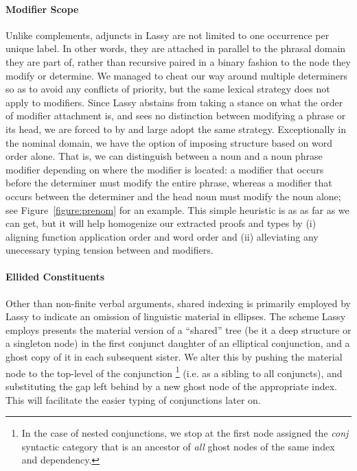 \paragraph{Modifier Scope}
Unlike complements, adjuncts in Lassy are not limited to one occurrence per unique label.
In other words, they are attached in parallel to the phrasal domain they are part of, rather than recursive paired in a binary fashion to the node they modify or determine.
We managed to cheat our way around multiple determiners so as to avoid any conflicts of priority, but the same lexical strategy does not apply to modifiers.
Since Lassy abstains from taking a stance on what the order of modifier attachment is, and sees no distinction between modifying a phrase or its head, we are forced to by and large adopt the same strategy.
Exceptionally in the nominal domain, we have the option of imposing structure based on word order alone.
That is, we can distinguish between a noun and a noun phrase modifier depending on where the modifier is located: a modifier that occurs before the determiner must modify the entire phrase, whereas a modifier that occurs between the determiner and the head noun must modify the noun alone; see Figure~\ref{figure:prenom} for an example.
This simple heuristic is as as far as we can get, but it will help homogenize our extracted proofs and types by (i) aligning function application order and word order and (ii) alleviating any unecessary typing tension between  and  modifiers.

\paragraph{Ellided Constituents}
Other than non-finite verbal arguments, shared indexing is primarily employed by Lassy to indicate an omission of linguistic material in ellipses.
The scheme Lassy employs presents the material version of a ``shared'' tree (be it a deep structure or a singleton node) in the first conjunct daughter of an elliptical conjunction, and a ghost copy of it in each subsequent sister.
We alter this by pushing the material node to the top-level of the conjunction%
		\footnote{In the case of nested conjunctions, we stop at the first node assigned the \textit{conj} syntactic category that is an ancestor of \textit{all} ghost nodes of the same index and dependency.}
(i.e. as a sibling to all conjuncts), and substituting the gap left behind by a new ghost node of the appropriate index.
This will facilitate the easier typing of conjunctions later on.

